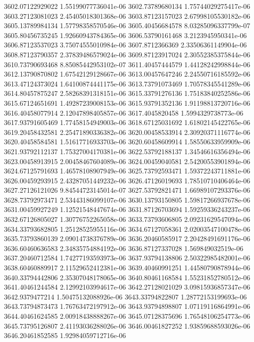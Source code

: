 {3602.07122929022 1.55199077736041e-06
3602.73789680134 1.75744029275417e-06
3603.27123081023 2.45405018301368e-06
3603.87123157023 2.67998105530182e-06
3605.13789984134 1.57798358570546e-06
3605.40456684578 8.03285096337799e-07
3605.80456735245 1.92660943784365e-06
3606.53790161468 3.2123945950341e-06
3606.87123537023 3.75074555010984e-06
3607.8712366369 2.33506361149904e-06
3608.87123790357 2.37839486579024e-06
3609.87123917024 2.30552385375844e-06
3610.73790693468 8.85085442953102e-07
3611.40457444579 1.44128242998844e-06
3612.13790870802 1.67542129128667e-06
3613.00457647246 2.24550716185592e-06
3613.47124373024 1.64100874441175e-06
3613.73791073469 1.70578345541289e-06
3614.80457875247 2.58268391318151e-06
3615.33791276136 1.75183840252586e-06
3615.67124651691 1.49287239008153e-06
3615.93791352136 1.91198813720716e-06
3616.40458077914 2.12047898405857e-06
3617.4045820458 1.5994329738773e-06
3617.93791605469 1.77458154949003e-06
3618.67125031692 1.61802145422765e-06
3619.20458432581 2.25471890336382e-06
3620.00458533914 2.30920371116774e-06
3620.40458584581 1.51617716933703e-06
3620.60458609914 1.58550633959909e-06
3621.93792112137 1.75327004170381e-06
3622.53792188137 1.34546616356494e-06
3623.00458913915 2.00458467604089e-06
3624.00459040581 2.54200553901894e-06
3624.67125791693 1.46578108907949e-06
3625.73792593471 1.59372243711881e-06
3626.00459293915 2.43287051449232e-06
3626.47126019693 1.78510710406464e-06
3627.27126121026 9.84544723145014e-07
3627.53792821471 1.66989107293376e-06
3628.73792973471 2.53443186099107e-06
3630.13793150805 1.59817266937678e-06
3631.00459927249 1.12521548447674e-06
3631.87126703694 1.59259336243237e-06
3632.67126805027 1.30776752265058e-06
3633.73793606805 2.09231629547094e-06
3634.33793682805 1.25128525955116e-06
3634.67127058361 2.02003547100478e-06
3635.73793860139 2.09014738376789e-06
3636.20460585917 2.20428491691176e-06
3636.60460636583 2.34835754884192e-06
3636.87127337028 1.569849032519e-06
3637.20460712584 1.74277193593973e-06
3637.93794138806 2.50322985482001e-06
3638.60460889917 2.11529652412381e-06
3639.40460991251 1.44580790878944e-06
3640.33794442806 2.35307048178065e-06
3640.80461168584 1.55231852780512e-06
3641.40461244584 2.12992103994617e-06
3642.27128021029 3.09815936857347e-06
3642.9379477214 1.50475132088926e-06
3643.33794822807 1.28772153199693e-06
3643.73794873473 1.76763472197912e-06
3643.93794898807 1.07119116864991e-06
3644.40461624585 2.00918438888267e-06
3645.07128375696 1.76548106254773e-06
3645.73795126807 2.41193036288026e-06
3646.00461827252 1.93859688593026e-06
3646.20461852585 1.92984059712716e-06
}
